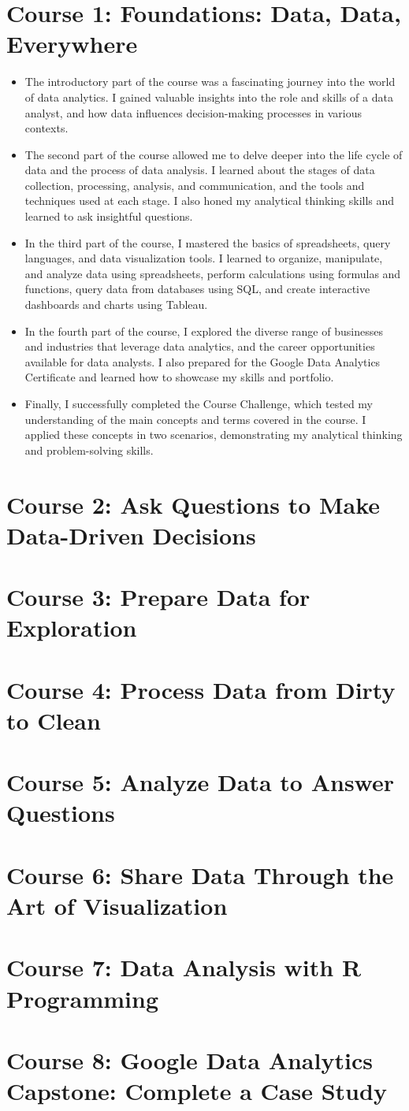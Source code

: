 \documentclass[]{article}
\begin{document}
\section{Course 1: Foundations: Data, Data, Everywhere}
\begin{itemize}
  \item The introductory part of the course was a fascinating journey into the world of data analytics. I gained valuable insights into the role and skills of a data analyst, and how data influences decision-making processes in various contexts.
  \item The second part of the course allowed me to delve deeper into the life cycle of data and the process of data analysis. I learned about the stages of data collection, processing, analysis, and communication, and the tools and techniques used at each stage. I also honed my analytical thinking skills and learned to ask insightful questions.
  \item In the third part of the course, I mastered the basics of spreadsheets, query languages, and data visualization tools. I learned to organize, manipulate, and analyze data using spreadsheets, perform calculations using formulas and functions, query data from databases using SQL, and create interactive dashboards and charts using Tableau.
  \item In the fourth part of the course, I explored the diverse range of businesses and industries that leverage data analytics, and the career opportunities available for data analysts. I also prepared for the Google Data Analytics Certificate and learned how to showcase my skills and portfolio.
  \item Finally, I successfully completed the Course Challenge, which tested my understanding of the main concepts and terms covered in the course. I applied these concepts in two scenarios, demonstrating my analytical thinking and problem-solving skills.
\end{itemize}
\section{Course 2: Ask Questions to Make Data-Driven Decisions}
\section{Course 3: Prepare Data for Exploration}
\section{Course 4: Process Data from Dirty to Clean}
\section{Course 5: Analyze Data to Answer Questions}
\section{Course 6: Share Data Through the Art of Visualization}
\section{Course 7: Data Analysis with R Programming}
\section{Course 8: Google Data Analytics Capstone: Complete a Case Study}
\end{document}
